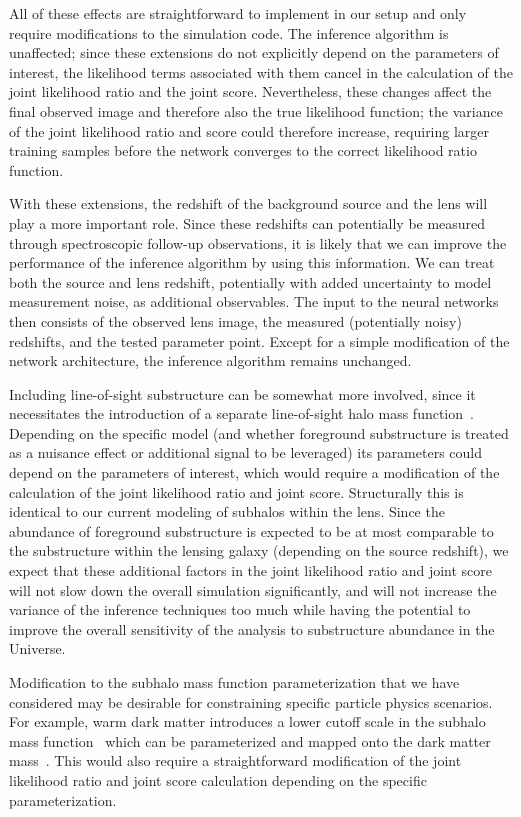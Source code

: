\documentclass[twocolumn]{aastex63}
\begin{document}
All of these effects are straightforward to implement in our setup and only require modifications to the simulation code. The inference algorithm is unaffected; since these extensions do not explicitly depend on the parameters of interest, the likelihood terms associated with them cancel in the calculation of the joint likelihood ratio and the joint score. Nevertheless, these changes affect the final observed image and therefore also the true likelihood function; the variance of the joint likelihood ratio and score could therefore increase, requiring larger training samples before the network converges to the correct likelihood ratio function.

With these extensions, the redshift of the background source and the lens will play a more important role. Since these redshifts can potentially be measured through spectroscopic follow-up observations, it is likely that we can improve the performance of the inference algorithm by using this information. We can treat both the source and lens redshift, potentially with added uncertainty to model measurement noise, as additional observables. The input to the neural networks then consists of the observed lens image, the measured (potentially noisy) redshifts, and the tested parameter point. Except for a simple modification of the network architecture, the inference algorithm remains unchanged.

Including line-of-sight substructure can be somewhat more involved, since it necessitates the introduction of a separate line-of-sight halo mass function~\citep{1610.01599,1710.05029,1901.11031,2019arXiv190504182H}. Depending on the specific model (and whether foreground substructure is treated as a nuisance effect or additional signal to be leveraged) its parameters could depend on the parameters of interest, which would require a modification of the calculation of the joint likelihood ratio and joint score. Structurally this is identical to our current modeling of subhalos within the lens. Since the abundance of foreground substructure is expected to be at most comparable to the substructure within the lensing galaxy (depending on the source redshift), we expect that these additional factors in the joint likelihood ratio and joint score will not slow down the overall simulation significantly, and will not increase the variance of the inference techniques too much while having the potential to improve the overall sensitivity of the analysis to substructure abundance in the Universe.

Modification to the subhalo mass function parameterization that we have considered may be desirable for constraining specific particle physics scenarios. For example, warm dark matter introduces a lower cutoff scale in the subhalo mass function~\citep{2001ApJ...556...93B} which can be parameterized and mapped onto the dark matter mass~\citep{1112.0330,1308.1399,1512.06507,1702.00009}. This would also require a straightforward modification of the joint likelihood ratio and joint score calculation depending on the specific parameterization.
\end{document}
